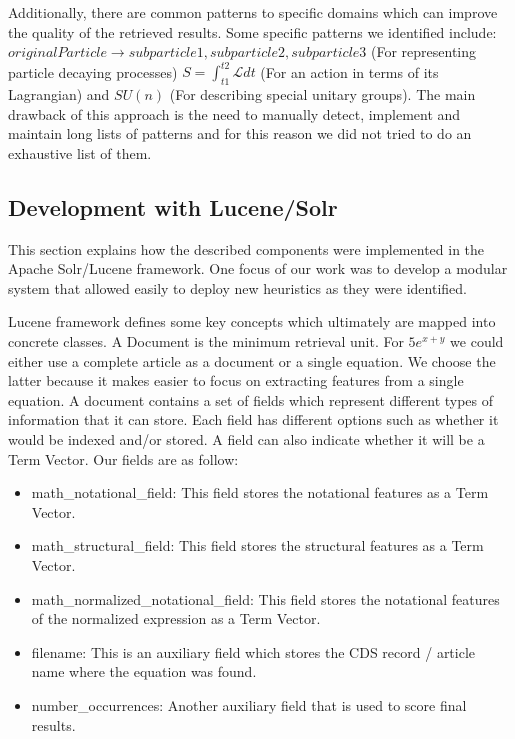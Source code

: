 Additionally, there are common patterns to specific domains which can improve the quality of the retrieved results. Some specific patterns we identified include: $originalParticle \rightarrow subparticle1, subparticle2, subparticle3$ (For representing particle decaying processes) $S = \int^{t2}_{t1} \mathcal{L} dt$ (For an action in terms of its Lagrangian) and $SU(n)$ (For describing special unitary groups). The main drawback of this approach is the need to manually detect, implement and maintain long lists of patterns and for this reason we did not tried to do an exhaustive list of them. 


\subsection{Development with Lucene/Solr}
This section explains how the described components were implemented in the {\codefont Apache Solr/Lucene} framework.
One focus of our work was to develop a modular system that allowed easily to deploy new heuristics as they were identified. 

Lucene framework defines some key concepts which ultimately are mapped into concrete classes. A {\codefont Document} is the minimum retrieval unit. For $5e^{x+y}$ we could either use a complete article as a document or a single equation. We choose the latter because it makes easier to focus on extracting features from a single equation. A document contains a set of {\codefont fields} which represent different types of information that it can store. Each field has different options such as whether it would be indexed and/or stored. A field can also indicate whether it will be a {\codefont Term Vector}. Our fields are as follow: 
\begin{itemize}
\item math\_notational\_field: This field stores the notational features as a Term Vector. 
\item math\_structural\_field: This field stores the structural features as a Term Vector. 
\item math\_normalized\_notational\_field: This field stores the notational features of the normalized expression as a Term Vector. 
\item filename: This is an auxiliary field which stores the CDS record / article name where the equation was found.
\item number\_occurrences: Another auxiliary field that is used to score final results.
\end{itemize} 

